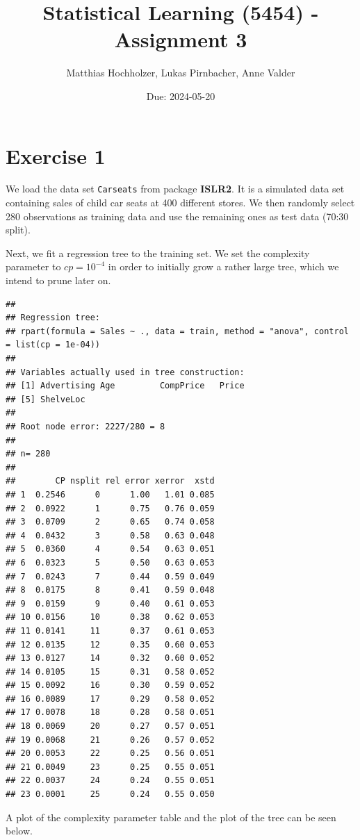 \documentclass[
]{article}
\title{Statistical Learning (5454) - Assignment 3}
\author{Matthias Hochholzer, Lukas Pirnbacher, Anne Valder}
\date{Due: 2024-05-20}
\begin{document}
\maketitle

\section{Exercise 1}\label{exercise-1}

We load the data set \texttt{Carseats} from package \textbf{ISLR2}. It
is a simulated data set containing sales of child car seats at 400
different stores. We then randomly select 280 observations as training
data and use the remaining ones as test data (70:30 split).

Next, we fit a regression tree to the training set. We set the
complexity parameter to \(cp = 10^{-4}\) in order to initially grow a
rather large tree, which we intend to prune later on.

\begin{verbatim}
## 
## Regression tree:
## rpart(formula = Sales ~ ., data = train, method = "anova", control = list(cp = 1e-04))
## 
## Variables actually used in tree construction:
## [1] Advertising Age         CompPrice   Price      
## [5] ShelveLoc  
## 
## Root node error: 2227/280 = 8
## 
## n= 280 
## 
##        CP nsplit rel error xerror  xstd
## 1  0.2546      0      1.00   1.01 0.085
## 2  0.0922      1      0.75   0.76 0.059
## 3  0.0709      2      0.65   0.74 0.058
## 4  0.0432      3      0.58   0.63 0.048
## 5  0.0360      4      0.54   0.63 0.051
## 6  0.0323      5      0.50   0.63 0.053
## 7  0.0243      7      0.44   0.59 0.049
## 8  0.0175      8      0.41   0.59 0.048
## 9  0.0159      9      0.40   0.61 0.053
## 10 0.0156     10      0.38   0.62 0.053
## 11 0.0141     11      0.37   0.61 0.053
## 12 0.0135     12      0.35   0.60 0.053
## 13 0.0127     14      0.32   0.60 0.052
## 14 0.0105     15      0.31   0.58 0.052
## 15 0.0092     16      0.30   0.59 0.052
## 16 0.0089     17      0.29   0.58 0.052
## 17 0.0078     18      0.28   0.58 0.051
## 18 0.0069     20      0.27   0.57 0.051
## 19 0.0068     21      0.26   0.57 0.052
## 20 0.0053     22      0.25   0.56 0.051
## 21 0.0049     23      0.25   0.55 0.051
## 22 0.0037     24      0.24   0.55 0.051
## 23 0.0001     25      0.24   0.55 0.050
\end{verbatim}

A plot of the complexity parameter table and the plot of the tree can be
seen below.
\end{document}
